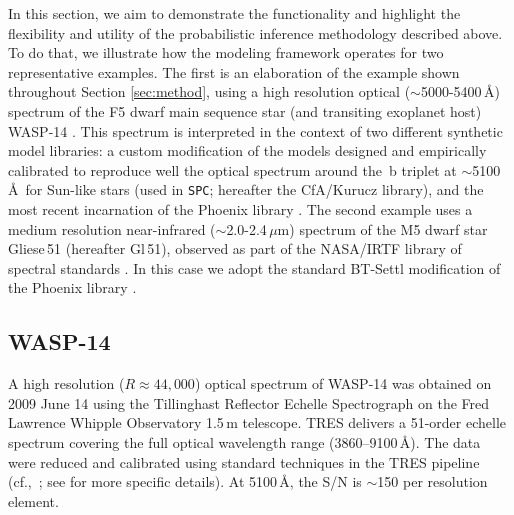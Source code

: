 \documentclass[iop,floatfix]{emulateapj}
\begin{document}
In this section, we aim to demonstrate the functionality and highlight the flexibility and utility 
of the probabilistic inference methodology described above.  To do that, we illustrate how the 
modeling framework operates for two representative examples.  The first is an elaboration of the 
example shown throughout Section \ref{sec:method}, using a high resolution optical 
($\sim$5000-5400\,\AA) spectrum of the F5 dwarf main sequence star (and transiting exoplanet host) 
WASP-14 \citep{joshi09,torres12}.  This spectrum is interpreted in the context of two different 
synthetic model libraries: a custom modification of the \citet{castelli04} models designed and 
empirically calibrated to reproduce well the optical spectrum around the \,b triplet at 
$\sim$5100\,\AA\ for Sun-like stars (used in {\tt SPC}; hereafter the {\sc CfA/Kurucz} library), 
and the most recent incarnation of the {\sc Phoenix} library \citep{husser13}.  The second 
example uses a medium resolution near-infrared ($\sim$2.0-2.4\,$\mu$m) spectrum of the M5 dwarf 
star Gliese\,51 (hereafter Gl\,51), observed as part of the NASA/IRTF library of spectral standards 
\citep{cushing05,rayner09}.  In this case we adopt the standard {\sc BT-Settl} modification of the 
{\sc Phoenix} library \citep{allard12}.



\subsection{WASP-14} \label{subsec:wasp}

A high resolution ($R\approx44,000$) optical spectrum of WASP-14 was obtained on 2009 June 14 
using the Tillinghast Reflector Echelle Spectrograph \citep[TRES;][]{furesz08} on the Fred Lawrence 
Whipple Observatory 1.5\,m telescope.  TRES delivers a 51-order echelle spectrum covering the 
full optical wavelength range (3860--9100\,\AA).  The data were reduced and calibrated using 
standard techniques in the TRES pipeline (cf.,~\citealt{mink11}; see \citealt{torres12} for more 
specific details).  At 5100\,\AA, the S/N is $\sim$150 per resolution element.  
\end{document}
